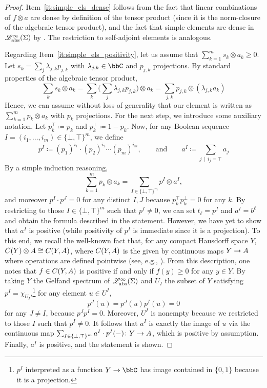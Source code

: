 \begin{proof}
	Item~\ref{it:simple_els_dense} follows from the fact that linear combinations of $f\otimes a$ are dense by definition of the tensor product (since it is the norm-closure of the algebraic tensor product), and the fact that simple elements are dense in $\mathscr{L}_{\operatorname{abs}}^{\infty}(\Sigma)$ by \cite[Corollary 3.4.4]{fritz2025categories}.
	The restriction to self-adjoint elements is analogous.

	Regarding Item~\ref{it:simple_els_positivity}, let us assume that $\sum_{k=1}^m s_k \otimes a_k\ge 0$.
	Let $s_k= \sum_{j} \lambda_{j,k} p_{j,k}$ with $\lambda_{j,k}\in\bbC$ and $p_{j,k}$ projections.
	By standard properties of the algebraic tensor product,
	\[\textstyle
		\sum_k s_k \otimes a_k =  \sum_k \Big(\sum_j  \lambda_{j,k} p_{j,k}\Big)\otimes a_k = \sum_{j,k} p_{j,k}\otimes (\lambda_{j,k}a_k)
	\]
	Hence, we can assume without loss of generality that our element is written as $\sum_{k=1}^m p_k \otimes a_k$ with $p_k$ projections.
	For the next step, we introduce some auxiliary notation. Let $p_k^{\top}\coloneqq p_k$ and $p_k^{\bot}\coloneqq 1-p_k$.
	Now, for any Boolean sequence $I=(i_1, \dots, i_m) \in \lbrace \bot,\top\rbrace^m$, we define
	\[
		p^I \coloneqq (p_1)^{i_1} \cdot (p_2)^{i_2} \cdots (p_m)^{i_m}, \qquad \text{and}\qquad a^I \coloneqq \sum_{j \,\mid\, i_j=\top} a_j
	\]
	By a simple induction reasoning,
	\[
		\sum_{k=1}^m p_k \otimes a_k = \sum_{I \in \lbrace \bot,\top\rbrace^m} p^I \otimes a^I,
	\]
	and moreover $p^I \cdot p^J=0$ for any distinct $I,J$ because $p_k^{\top}p_k^{\bot} =0$ for any $k$.
	By restricting to those $I\in \lbrace \bot,\top\rbrace^m$ such that $p^I\neq 0$, we can set $t_{\ell}=p^I$ and $a^I=b^{\ell}$ and obtain the formula described in the statement.
	However, we have yet to show that $a^I$ is positive (while positivity of $p^I$ is immediate since it is a projection).
	To this end, we recall the well-known fact that, for any compact Hausdorff space $Y$, $C(Y)\otimes {A} \cong C(Y,{A})$, where $C(Y,{A})$ is the \cstar{} given by continuous maps $Y\to {A}$ where operations are defined pointwise (see, e.g., \cite[Corollary T.6.17]{weggeolsen1993Ktheory}).
	From this description, one notes that $f\in C(Y,{A})$ is positive if and only if $f(y)\ge 0$ for any $y\in Y$.
	By taking $Y$ the Gelfand spectrum of $\mathscr{L}_{\operatorname{abs}}^{\infty}(\Sigma)$ and $U_I $ the subset of $Y$ satisfying $p^I = \chi_{U_I}$,\footnote{$p^I$ interpreted as a function $Y\to\bbC$ has image contained in $\lbrace 0,1\rbrace$ because it is a projection.} for any element $u\in U^I$,
	\[
		p^J(u)=p^J(u)p^I(u)= 0
	\] for any $J\neq I$, because $p^J p^I=0$.
	Moreover, $U^I$ is nonempty because we restricted to those $I$ such that $p^I\neq 0$.
	It follows that $a^I$ is exactly the image of $u$ via the continuous map $\sum_{I \in \lbrace \bot,\top\rbrace^m} a^I \cdot p^I(-) \colon Y \to {A}$, which is positive by assumption.
	Finally, $a^I$ is positive, and the statement is shown.
\end{proof}

